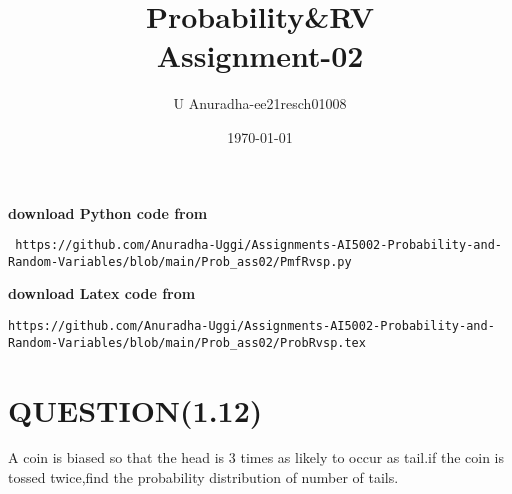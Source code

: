 \documentclass[journal,12pt,twocolumn]{IEEEtran}
\title{Probability\&RV \\ Assignment-02}
\author{U Anuradha-ee21resch01008}
\date{\today}
\begin{document}
\maketitle
\newpage
\bigskip
\renewcommand{\thefigure}{\theenumi}
\renewcommand{\thetable}{\theenumi}
\textbf{download Python code from}
\begin{lstlisting}
 https://github.com/Anuradha-Uggi/Assignments-AI5002-Probability-and-Random-Variables/blob/main/Prob_ass02/PmfRvsp.py
\end{lstlisting}
\textbf{download Latex code from}
\begin{lstlisting}
https://github.com/Anuradha-Uggi/Assignments-AI5002-Probability-and-Random-Variables/blob/main/Prob_ass02/ProbRvsp.tex
\end{lstlisting}
\section{QUESTION(1.12)}
A coin is biased so that the head is 3 times as likely to occur as tail.if the coin is tossed twice,find the probability distribution of number of tails. \\
\end{document}
